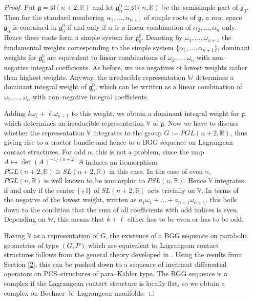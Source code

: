 \documentclass[12pt,a4paper]{amsart}
\def\frak{\mathfrak}
\def\Bbb{\mathbb}
\newcommand{\al}{\alpha}
\newcommand{\om}{\omega}
\numberwithin{theorem}{section}
\theoremstyle{definition}
\theoremstyle{remark}
\begin{document}
\begin{proof}
Put $\frak g=\frak{sl}(n+2,\Bbb R)$ and let $\frak
g_0^0\cong\frak{sl}(n,\Bbb R)$ be the semisimple part of $\frak
g_0$. Then for the standard numbering $\al_1,\dots,\al_{n+1}$ of
simple roots of $\frak g$, a root space $\frak g_{\al}$ is contained
in $\frak g_0^0$ if and only if $\al$ is a linear combination of
$\al_2,\dots,\al_n$ only. Hence these roots form a simple system for
$\frak g_0^0$. Denoting by $\om_1,\dots,\om_{n+1}$ the fundamental
weights corresponding to the simple system
$\{\al_1,\dots,\al_{n+1}\}$, dominant weights for $\frak g_0^0$ are
equivalent to linear combinations of $\om_2,\dots,\om_n$ with
non--negative integral coefficients. As before, we use negatives of
lowest weights rather than highest weights. Anyway, the irreducible
representation $\Bbb W$ determines a dominant integral weight of
$\frak g_0^0$, which can be written as a linear combination of
$\om_2,\dots,\om_n$ with non--negative integral coefficients.

Adding $k\om_1+\ell\om_{n+1}$ to this weight, we obtain a dominant
integral weight for $\frak g$, which determines an irreducible
representation $\Bbb V$ of $\frak g$. Now we have to discuss whether
the representation $\Bbb V$ integrates to the group $G:=PGL(n+2,\Bbb
R)$, thus giving rise to a tractor bundle and hence to a BGG sequence
on Lagrangean contact structures. For odd $n$, this is not a problem,
since the map $A\mapsto \det(A)^{-1/(n+2)}A$ induces an isomorphism
$PGL(n+2,\Bbb R)\cong SL(n+2,\Bbb R)$ in this case. In the case of
even $n$, $PGL(n,\Bbb R)$ is well known to be isomorphic to
$PSL(n,\Bbb R)$. Hence $\Bbb V$ integrates if and only if the center
$\{\pm\Bbb I\}$ of $SL(n+2,\Bbb R)$ acts trivially on $\Bbb V$. In
terms of the negative of the lowest weight, written as
$a_1\om_1+\dots+a_{n+1}\om_{n+1}$, this boils down to the condition
that the sum of all coefficients with odd indices is even. Depending
on $\Bbb W$, this means that $k+\ell$ either has to be even or has to
be odd.

Having $\Bbb V$ as a representation of $G$, the existence of a BGG
sequence on parabolic geometries of type $(G,P)$ which are equivalent
to Lagrangean contact structures follows from the general theory
developed in \cites{CSS-BGG,Calderbank-Diemer,Rel-BGG2}. Using the
results from Section \ref{2}, this can be pushed down to a sequence of
invariant differential operators on PCS--structures of para--K\"ahler
type. The BGG sequence is a complex if the Lagrangean contact
structure is locally flat, so we obtain a complex on
Bochner--bi--Lagrangean manifolds.


\end{proof}
\end{document}
